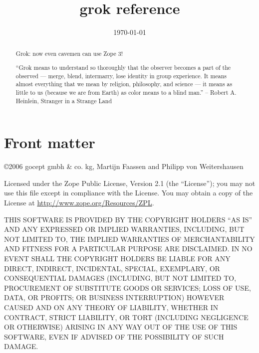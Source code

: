 \documentclass{manual}
\title{grok reference}
\date{\today}   %
\begin{document}
\maketitle

\ifhtml
\chapter*{Front matter\label{front}}
\fi

\copyright 2006 gocept gmbh \& co. kg, Martijn Faassen and Philipp von
Weitershausen

Licensed under the Zope Public License, Version 2.1 (the ``License''); you may
not use this file except in compliance with the License. You may obtain a copy
of the License at \url{http://www.zope.org/Resources/ZPL}.

THIS SOFTWARE IS PROVIDED BY THE COPYRIGHT HOLDERS ``AS IS'' AND ANY EXPRESSED
OR IMPLIED WARRANTIES, INCLUDING, BUT NOT LIMITED TO, THE IMPLIED WARRANTIES OF
MERCHANTABILITY AND FITNESS FOR A PARTICULAR PURPOSE ARE DISCLAIMED. IN NO
EVENT SHALL THE COPYRIGHT HOLDERS BE LIABLE FOR ANY DIRECT, INDIRECT,
INCIDENTAL, SPECIAL, EXEMPLARY, OR CONSEQUENTIAL DAMAGES (INCLUDING, BUT NOT
LIMITED TO, PROCUREMENT OF SUBSTITUTE GOODS OR SERVICES; LOSS OF USE, DATA, OR
PROFITS; OR BUSINESS INTERRUPTION) HOWEVER CAUSED AND ON ANY THEORY OF
LIABILITY, WHETHER IN CONTRACT, STRICT LIABILITY, OR TORT (INCLUDING NEGLIGENCE
OR OTHERWISE) ARISING IN ANY WAY OUT OF THE USE OF THIS SOFTWARE, EVEN IF
ADVISED OF THE POSSIBILITY OF SUCH DAMAGE.

\begin{abstract}

\noindent

Grok: now even cavemen can use Zope 3!

\begin{notice}
``Grok means to understand so thoroughly that the observer becomes a part of the
observed --- merge, blend, intermarry, lose identity in group experience.
It means almost everything that we mean by religion, philosophy, and
science --- it means as little to us (because we are from Earth) as color
means to a blind man.'' -- Robert A. Heinlein, Stranger in a Strange Land
\end{notice}

\end{abstract}

\tableofcontents












\end{document}

